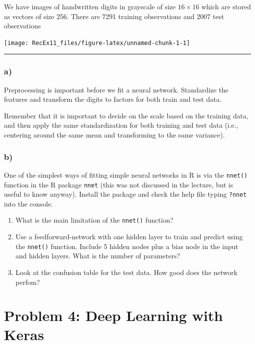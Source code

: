 \documentclass[]{article}
\begin{document}
We have images of handwritten digits in grayscale of size \(16\times16\)
which are stored as vectors of size 256. There are 7291 training
observations and 2007 test observations

\begin{center}\texttt{[image: RecEx11\_files/figure-latex/unnamed-chunk-1-1]} \end{center}

\begin{center}\rule{0.5\linewidth}{0.5pt}\end{center}

\hypertarget{a-2}{%
\subsubsection{a)}\label{a-2}}

Preprocessing is important before we fit a neural network. Standardize
the features and transform the digits to factors for both train and test
data.

Remember that it is important to decide on the scale based on the
training data, and then apply the same standardization for both training
and test data (i.e., centering around the same mean and transforming to
the same variance).

\hypertarget{b-2}{%
\subsubsection{b)}\label{b-2}}

One of the simplest ways of fitting simple neural networks in R is via
the \texttt{nnet()} function in the R package \texttt{nnet} (this was
not discussed in the lecture, but is useful to know anyway). Install the
package and check the help file typing \texttt{?nnet} into the console.

\begin{enumerate}
\def\labelenumi{(\roman{enumi})}
\item
  What is the main limitation of the \texttt{nnet()} function?
\item
  Use a feedforward-network with one hidden layer to train and predict
  using the \texttt{nnet()} function. Include 5 hidden nodes plus a bias
  node in the input and hidden layers. What is the number of parameters?
\item
  Look at the confusion table for the test data. How good does the
  network perfom?
\end{enumerate}

\hypertarget{problem-4-deep-learning-with-keras}{%
\section{Problem 4: Deep Learning with
Keras}\label{problem-4-deep-learning-with-keras}}
\end{document}
